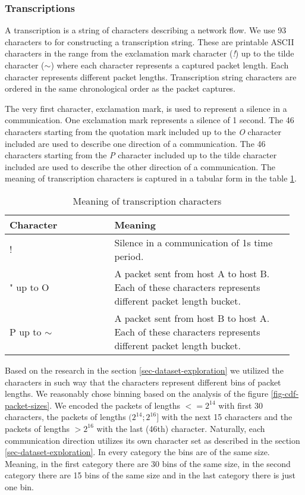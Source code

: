 \documentclass{article}
\begin{document}
\subsubsection{Transcriptions}

A transcription is a string of characters describing a network flow. We use 93 characters to for constructing a transcription string. These are printable ASCII characters in the range from the exclamation mark character (\textit{!}) up to the tilde character (\textit{$\sim$}) where each character represents a captured packet length. Each character represents different packet lengths. Transcription string characters are ordered in the same chronological order as the packet captures.

The very first character, exclamation mark, is used to represent a silence in a communication. One exclamation mark represents a silence of 1 second. The 46 characters starting from the quotation mark included up to the \textit{O} character included are used to describe one direction of a communication. The 46 characters starting from the \textit{P} character included up to the tilde character included are used to describe the other direction of a communication. The meaning of transcription characters is captured in a tabular form in the table \ref{tab:character-meanings}.

\begin{table}[h!]
\centering
\begin{tabular}{ |p{0.35\linewidth} | p{0.6\linewidth}| }
 \hline
 Character & Meaning \\
 \hline \hline
 ! & Silence in a communication of 1s time period. \\
 \hline
 " up to O & A packet sent from host A to host B. Each of these characters represents different packet length bucket. \\
 \hline
 P up to $\sim$ & A packet sent from host B to host A. Each of these characters represents different packet length bucket. \\
 \hline
\end{tabular}
\caption{Meaning of transcription characters}
\label{tab:character-meanings}
\end{table}

Based on the research in the section \ref{sec-dataset-exploration} we utilized the characters in such way that the characters represent different bins of packet lengths. We reasonably chose binning based on the analysis of the figure \ref{fig-cdf-packet-sizes}. We encoded the packets of lengths $<= 2^{14}$ with first 30 characters, the packets of lengths $(2^{14}; 2^{16}]$ with the next 15 characters and the packets of lengths $> 2^{16}$ with the last (46th) character. Naturally, each communication direction utilizes its own character set as described in the section \ref{sec-dataset-exploration}. In every category the bins are of the same size. Meaning, in the first category there are 30 bins of the same size, in the second category there are 15 bins of the same size and in the last category there is just one bin.
\end{document}

